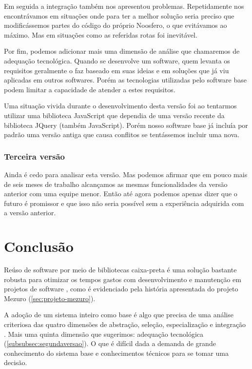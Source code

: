 \documentclass[12pt]{article}
\begin{document}
    Em seguida a integração também nos apresentou problemas. Repetidamente nos encontrávamos em situações onde para ter a melhor solução seria preciso que modificássemos partes do código do próprio Noosfero, o que evitávamos ao máximo. Mas em situações como as referidas rotas foi inevitável.

    Por fim, podemos adicionar mais uma dimensão de análise que chamaremos de adequação tecnológica. Quando se desenvolve um software, quem levanta os requisitos geralmente o faz baseado em suas ideias e em soluções que já viu aplicadas em outros softwares. Porém as tecnologias utilizadas pelo software base podem limitar a capacidade de atender a estes requisitos.

    Uma situação vivida durante o desenvolvimento desta versão foi ao tentarmos utilizar uma biblioteca JavaScript que dependia de uma versão recente da biblioteca JQuery (também JavaScript). Porém nosso software base já incluía por padrão uma versão antiga que causa conflitos se tentássemos incluir uma nova.

    \subsubsection{Terceira versão}
    Ainda é cedo para analisar esta versão. Mas podemos afirmar que em pouco mais de seis meses de trabalho alcançamos as mesmas funcionalidades da versão anterior com uma equipe menor. Então até agora podemos apenas dizer que o futuro é promissor e que isso não seria possível sem a experiência adquirida com a versão anterior.

\section{Conclusão} \label{sec:conclusao}
Reúso de software por meio de bibliotecas caixa-preta é uma solução bastante robusta para otimizar os tempos gastos com desenvolvimento e manutenção em projetos de software \cite{hdghi11}, como é evidenciado pela história apresentada do projeto Mezuro (\ref{sec:projeto-mezuro}).

A adoção de um sistema inteiro como base é algo que precisa de uma análise criteriosa das quatro dimensões de abstração, seleção, especialização e integração \cite{k92}. Mais uma quinta dimensão que sugerimos: adequação tecnológica (\ref{subsubsec:segundaversao}). O que é difícil dada a demanda de grande conhecimento do sistema base e conhecimentos técnicos para se tomar uma decisão.



\end{document}
